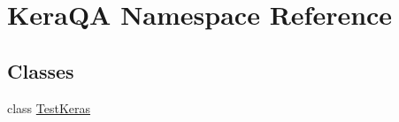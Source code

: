 \hypertarget{namespace_kera_q_a}{}\section{Kera\+QA Namespace Reference}
\label{namespace_kera_q_a}
\subsection*{Classes}
\begin{DoxyCompactItemize}
\item 
class \mbox{\hyperlink{class_kera_q_a_1_1_test_keras}{Test\+Keras}}
\end{DoxyCompactItemize}
